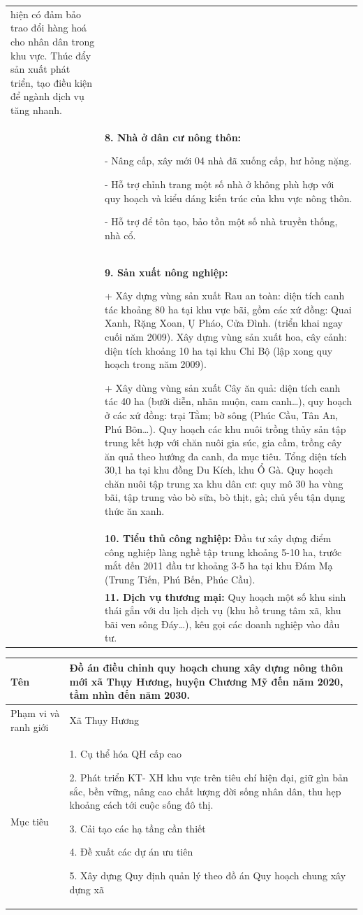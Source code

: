 \documentclass[../thesis.tex]{subfiles}
\begin{document}
\begin{landscape}
\begin{longtable}{ | m{3cm} | m{18cm}| }
hiện có đảm bảo trao đổi hàng hoá cho nhân dân trong khu vực. Thúc đẩy sản xuất phát triển, tạo điều kiện để ngành dịch vụ tăng nhanh.\\&  \textbf{8. Nhà ở dân cư nông thôn:}\par - Nâng cấp, xây mới 04 nhà đã xuống cấp, hư hỏng nặng.\par - Hỗ trợ chỉnh trang một số nhà ở không phù hợp với quy hoạch và kiểu dáng kiến trúc của khu vực nông thôn.\par - Hỗ trợ để tôn tạo, bảo tồn một số nhà truyền thống, nhà cổ. \\&  \textbf{9. Sản xuất nông nghiệp:}\par + Xây dựng vùng sản xuất Rau an toàn: diện tích canh tác khoảng 80 ha tại khu vực bãi, gồm các xứ đồng: Quai Xanh, Rặng Xoan, Ụ Pháo, Cửa Đình. (triển khai ngay cuối năm 2009). Xây dựng vùng sản xuất hoa, cây cảnh: diện tích khoảng 10 ha tại khu Chỉ Bộ (lập xong quy hoạch trong năm 2009). \par+ Xây dùng vùng sản xuất Cây ăn quả: diện tích canh tác 40 ha (bưởi diễn, nhãn muộn, cam canh…), quy hoạch ở các xứ đồng: trại Tằm; bờ sông (Phúc Cầu, Tân An, Phú Bõn…). Quy hoạch các khu nuôi trồng thủy sản tập trung kết hợp với chăn nuôi gia súc, gia cầm, trồng cây ăn quả theo hướng đa canh, đa mục tiêu. Tổng diện tích 30,1 ha tại khu đồng Du Kích, khu Ổ Gà. Quy hoạch chăn nuôi tập trung xa khu dân cư: quy mô 30 ha vùng bãi, tập trung vào bò sữa, bò thịt, gà; chủ yếu tận dụng thức ăn xanh. \\&  \textbf{10. Tiểu thủ công nghiệp: }Đầu tư xây dựng điểm công nghiệp làng nghề tập trung khoảng 5-10 ha, trước mắt đến 2011 đầu tư khoảng 3-5 ha tại khu Đám Mạ (Trung Tiến, Phú Bến, Phúc Cầu). \\&  \textbf{11. Dịch vụ thương mại:} Quy hoạch một số khu sinh thái gắn với du lịch dịch vụ (khu hồ trung tâm xã, khu bãi ven sông Đáy…), kêu gọi các doanh nghiệp vào đầu tư.\\
\hline
\end{longtable}
\clearpage
\begin{longtable}{ | m{3cm} | m{18cm}| } 
\hline
Tên &\textbf{Đồ án điều chỉnh quy hoạch chung xây dựng nông thôn mới xã Thụy Hương, huyện Chương Mỹ đến năm 2020, tầm nhìn đến năm 2030.}\\
\hline
Phạm vi và ranh giới & Xã Thụy Hương   \\ \hline
Mục tiêu    &1. Cụ thể hóa QH cấp cao \par2. Phát triển KT- XH khu vực trên tiêu chí hiện đại, giữ gìn bản sắc, bền vững, nâng cao chất lượng đời sống nhân dân, thu hẹp khoảng cách tới cuộc sống đô thị. \par3. Cải tạo các hạ tầng cần thiết \par4. Đề xuất các dự án ưu tiên \par5. Xây dựng Quy định quản lý theo đồ án Quy hoạch chung xây dựng xã    \\ \hline

\end{longtable}
\end{landscape}
\end{document}
